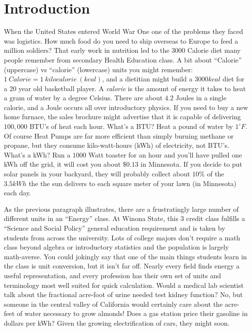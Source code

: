 \documentclass[prb,preprint]{revtex4-2}
\begin{document}
\section{Introduction}
When the United States entered World War One one of the problems they faced was logistics.  How much food do you need to ship overseas to Europe to feed a million soldiers?  That early work in nutrition led to the $3000$ Calorie diet many people remember from secondary Health Education class.  A bit about ``Calorie'' (uppercase) vs ``calorie'' (lowercase) units you might remember: $1~Calorie = 1~kilocalorie~(kcal)$, and a dietitian might build a $3000 kcal$ diet for a 20 year old basketball player.  A \textit{calorie} is the amount of energy it takes  to heat a gram of water by a degree Celsius.  There are about $4.2$ Joules in a single calorie, and a Joule occurs all over introductory  physics.  If you need to buy a new home furnace, the sales brochure might advertise that it is capable of delivering $100,000$ BTU's of heat each hour.  What's a BTU? Heat a pound of water by $1^{\circ}F$.  Of course Heat Pumps are far more efficient than simply burning methane or propane, but they consume kilo-watt-hours (kWh) of electricity, not BTU's.  What's a kWh?  Run a $1000$ Watt toaster for an hour and you'll have pulled one kWh off the grid, it will cost you about $\$0.13$ in Minnesota.  If you decide to put solar panels in your backyard, they will probably collect about $10\%$ of the $3.5kWh$ the  the sun delivers to each square meter of your lawn (in Minnesota) each day.  

As the previous paragraph illustrates, there are a frustratingly large number of different units in an ``Energy'' class.  At 
Winona 
State, this 3 credit class fulfills a ``Science and Social Policy'' general education requirement and is taken by students from across the university.   Lots of college majors don't require a math class beyond algebra or introductory statistics and the population is largely math-averse. You could jokingly say that one of the main things students learn in the class is unit conversion, but it isn't far off.  Nearly every field finds energy a useful representation, and every profession has their own set of units and terminology most well suited for quick calculation.  Would a medical lab scientist talk about the fractional acre-foot of urine needed test kidney function?  No, but someone in the central valley of California would certainly care about the acre-feet of water necessary to grow almonds!  Does a gas station price their gasoline in dollars per kWh? Given the growing electrification of cars, they might soon.
\end{document}
